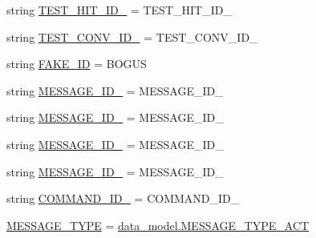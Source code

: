 \begin{DoxyCompactItemize}
\item 
string \hyperlink{namespaceparlai_1_1mturk_1_1core_1_1dev_1_1test_1_1test__full__system_a8e979eb1328cedde56e179addf27ef0e}{T\+E\+S\+T\+\_\+\+H\+I\+T\+\_\+\+I\+D\+\_} = \textquotesingle{}T\+E\+S\+T\+\_\+\+H\+I\+T\+\_\+\+I\+D\+\_\textquotesingle{}
\item 
string \hyperlink{namespaceparlai_1_1mturk_1_1core_1_1dev_1_1test_1_1test__full__system_af4da006675deaae099733d8904bb8874}{T\+E\+S\+T\+\_\+\+C\+O\+N\+V\+\_\+\+I\+D\+\_} = \textquotesingle{}T\+E\+S\+T\+\_\+\+C\+O\+N\+V\+\_\+\+I\+D\+\_\textquotesingle{}
\item 
string \hyperlink{namespaceparlai_1_1mturk_1_1core_1_1dev_1_1test_1_1test__full__system_ae6c8c967fca2bbff70cd9c5d92e8925a}{F\+A\+K\+E\+\_\+\+ID} = \textquotesingle{}B\+O\+G\+US\textquotesingle{}
\item 
string \hyperlink{namespaceparlai_1_1mturk_1_1core_1_1dev_1_1test_1_1test__full__system_a026f34dac881a97b38eefb6da8639662}{M\+E\+S\+S\+A\+G\+E\+\_\+\+I\+D\+\_} = \textquotesingle{}M\+E\+S\+S\+A\+G\+E\+\_\+\+I\+D\+\_\textquotesingle{}
\item 
string \hyperlink{namespaceparlai_1_1mturk_1_1core_1_1dev_1_1test_1_1test__full__system_a75eaaefb6763f4b4c8ef768cf1b1a04f}{M\+E\+S\+S\+A\+G\+E\+\_\+\+I\+D\+\_} = \textquotesingle{}M\+E\+S\+S\+A\+G\+E\+\_\+\+I\+D\+\_\textquotesingle{}
\item 
string \hyperlink{namespaceparlai_1_1mturk_1_1core_1_1dev_1_1test_1_1test__full__system_aa98abae11fea919f2e17731ddf478565}{M\+E\+S\+S\+A\+G\+E\+\_\+\+I\+D\+\_} = \textquotesingle{}M\+E\+S\+S\+A\+G\+E\+\_\+\+I\+D\+\_\textquotesingle{}
\item 
string \hyperlink{namespaceparlai_1_1mturk_1_1core_1_1dev_1_1test_1_1test__full__system_a2b6eb9d67673125d38bd4b495e548235}{M\+E\+S\+S\+A\+G\+E\+\_\+\+I\+D\+\_} = \textquotesingle{}M\+E\+S\+S\+A\+G\+E\+\_\+\+I\+D\+\_\textquotesingle{}
\item 
string \hyperlink{namespaceparlai_1_1mturk_1_1core_1_1dev_1_1test_1_1test__full__system_a7982f9f5b1cb8b787bbc78b4b451f643}{C\+O\+M\+M\+A\+N\+D\+\_\+\+I\+D\+\_} = \textquotesingle{}C\+O\+M\+M\+A\+N\+D\+\_\+\+I\+D\+\_\textquotesingle{}
\item 
\hyperlink{namespaceparlai_1_1mturk_1_1core_1_1dev_1_1test_1_1test__full__system_aaf9739fdc23f01253eeb9e450ed55fc2}{M\+E\+S\+S\+A\+G\+E\+\_\+\+T\+Y\+PE} = \hyperlink{namespaceparlai_1_1mturk_1_1core_1_1dev_1_1data__model_a54f29cc8a3c119ca6c74b83bc857376b}{data\+\_\+model.\+M\+E\+S\+S\+A\+G\+E\+\_\+\+T\+Y\+P\+E\+\_\+\+A\+CT}

\end{DoxyCompactItemize}
